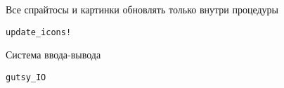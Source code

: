 \documentclass[a4paper,12pt]{article}
\begin{document}
Все спрайтосы и картинки обновлять только внутри процедуры \begin{verbatim}update_icons!\end{verbatim}
Система ввода-вывода \begin{verbatim}gutsy_IO\end{verbatim}
\end{document}
